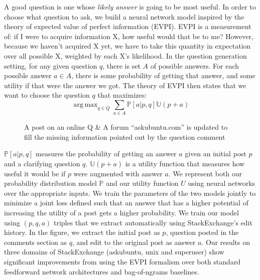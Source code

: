 \documentclass[11pt,a4paper]{article}
\DeclareMathOperator*{\argmax}{arg\,max}
\newcommand{\U}{\mathbb{U}}
\begin{document}
A good question is one whose \emph{likely answer} is going to be most useful. In order to choose what question to ask, we build a neural network model inspired by the theory of expected value of perfect information (EVPI). EVPI is a measurement of: if I were to acquire information X, how useful would that be to me? However, because we haven't acquired X yet, we have to take this quantity in expectation over all possible X, weighted by each X's likelihood. In the question generation setting, for any given question $q$, there is set $A$ of possible answers. For each possible answer $a \in A$, there is some probability of getting that answer, and some utility if that were the answer we got. The theory of EVPI then states that we want to choose the question $q$ that maximizes:
\begin{equation}\label{evpi_equation}
\argmax_{q \in Q} \sum_{a \in A} \mathbb{P}[a | p,q] \U(p+a)
\end{equation} 
\begin{figure}[!t]
	\centering
	\setlength\fboxsep{1pt}
	\setlength\fboxrule{0.5pt}
	\caption{A post on an online Q \& A forum ``askubuntu.com'' is updated to fill the missing information pointed out by the question comment}
	\label{askubuntu_post}
\end{figure}


$\mathbb{P}[a | p,q]$ measures the probability of getting an answer $a$ given an initial post $p$ and a clarifying question $q$. $\U(p+a)$ is a utility function that measures how useful it would be if $p$ were augmented with answer $a$. We represent both our probability distribution model $\mathbb{P}$ and our utility function $U$ using neural networks over the appropriate inputs.  We train the parameters of the two models jointly to minimize a joint loss defined such that an answer that has a higher potential of increasing the utility of a post gets a higher probability. We train our model using $(p,q,a)$ triples that we extract automatically using StackExchange's edit history. In the figure, we extract the initial post as $p$, question posted in the comments section as $q$, and edit to the original post as answer $a$. Our results on three domains of StackExchange (askubuntu, unix and superuser) show significant improvements from using the EVPI formalism over both standard feedforward network architectures and bag-of-ngrams baselines.



\end{document}
